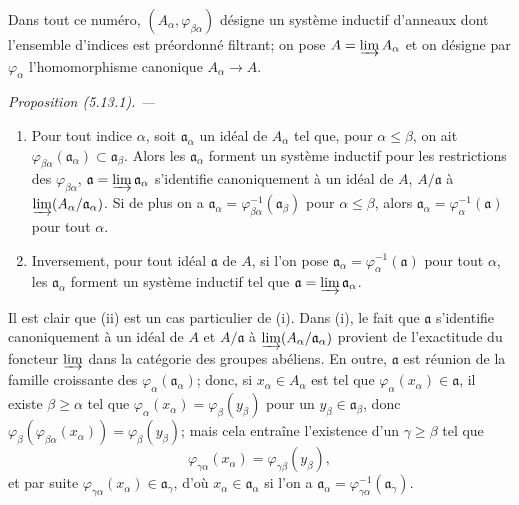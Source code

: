 \documentclass[10pt,oneside]{book}
\newenvironment{proposition}[1][]{%
  \par\medskip\noindent\itshape Proposition (#1). ---\ }{\par}
\begin{document}
Dans tout ce numéro, $(A_\alpha,\varphi_{\beta\alpha})$ désigne un système
inductif d'anneaux dont l'ensemble d'indices est préordonné filtrant; on pose
$A=\varinjlim A_\alpha$ et on désigne par $\varphi_\alpha$ l'homomorphisme
canonique $A_\alpha\to A$.

\begin{proposition}[5.13.1]
\label{IV.2.s5.13.1-fr}
\begin{enumerate}
\item[(i)] Pour tout indice $\alpha$, soit $\mathfrak a_\alpha$ un idéal de
$A_\alpha$ tel que, pour $\alpha\leq\beta$, on ait
$\varphi_{\beta\alpha}(\mathfrak a_\alpha)\subset\mathfrak a_\beta$. Alors
les $\mathfrak a_\alpha$ forment un système inductif pour les restrictions des
$\varphi_{\beta\alpha}$, $\mathfrak a=\varinjlim\mathfrak a_\alpha$
s'identifie canoniquement à un idéal de $A$, $A/\mathfrak a$ à
$\varinjlim(A_\alpha/\mathfrak a_\alpha)$. Si de plus on a
$\mathfrak a_\alpha=\varphi_{\beta\alpha}^{-1}(\mathfrak a_\beta)$ pour
$\alpha\leq\beta$, alors
$\mathfrak a_\alpha=\varphi_\alpha^{-1}(\mathfrak a)$ pour tout $\alpha$.
\item[(ii)] Inversement, pour tout idéal $\mathfrak a$ de $A$, si l'on pose
$\mathfrak a_\alpha=\varphi_\alpha^{-1}(\mathfrak a)$ pour tout $\alpha$, les
$\mathfrak a_\alpha$ forment un système inductif tel que
$\mathfrak a=\varinjlim\mathfrak a_\alpha$.
\end{enumerate}
\end{proposition}

Il est clair que (ii) est un cas particulier de (i). Dans (i), le fait que
$\mathfrak a$ s'identifie canoniquement à un idéal de $A$ et $A/\mathfrak a$ à
$\varinjlim(A_\alpha/\mathfrak a_\alpha)$ provient de l'exactitude du foncteur
$\varinjlim$ dans la catégorie des groupes abéliens. En outre, $\mathfrak a$
est réunion de la famille croissante des $\varphi_\alpha(\mathfrak a_\alpha)$;
donc, si $x_\alpha\in A_\alpha$ est tel que
$\varphi_\alpha(x_\alpha)\in\mathfrak a$, il existe $\beta\geq\alpha$ tel que
$\varphi_\alpha(x_\alpha)=\varphi_\beta(y_\beta)$ pour un
$y_\beta\in\mathfrak a_\beta$, donc
$\varphi_\beta(\varphi_{\beta\alpha}(x_\alpha))=\varphi_\beta(y_\beta)$; mais
cela entraîne l'existence d'un $\gamma\geq\beta$ tel que
\[
\varphi_{\gamma\alpha}(x_\alpha)=\varphi_{\gamma\beta}(y_\beta),
\]
et par suite $\varphi_{\gamma\alpha}(x_\alpha)\in\mathfrak a_\gamma$, d'où
$x_\alpha\in\mathfrak a_\alpha$ si l'on a
$\mathfrak a_\alpha=\varphi_{\gamma\alpha}^{-1}(\mathfrak a_\gamma)$.
\end{document}

